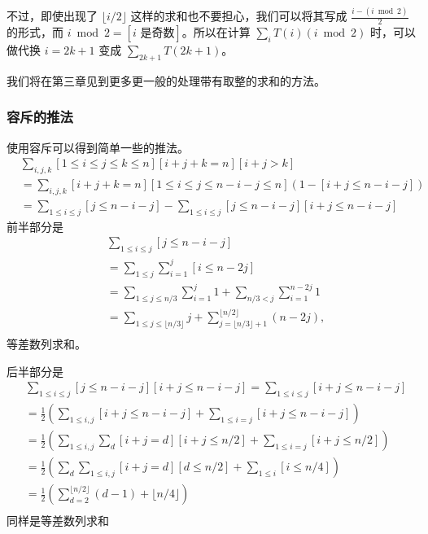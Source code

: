    不过，即使出现了 $\lfloor i/2\rfloor$ 这样的求和也不要担心，我们可以将其写成 $\frac{i-(i\bmod 2)}{2}$ 的形式，而 $i\bmod 2=[i\text{ 是奇数}]$。所以在计算 $\sum_{i} T(i)(i\bmod 2)$ 时，可以做代换 $i=2k+1$ 变成 $\sum_{2k+1}T(2k+1)$。

    我们将在第三章见到更多更一般的处理带有取整的求和的方法。
\subsubsection*{容斥的推法}
    使用容斥可以得到简单一些的推法。
    $$
    \begin{aligned}
        &\sum_{i,j,k}[1\le i\le j\le k\le n][i+j+k=n][i+j>k]\\
        &=\sum_{i,j,k}[i+j+k=n][1\le i\le j\le n-i-j\le n](1-[i+j\le n-i-j])\\
        &=\sum_{1\le i\le j}[j\le n-i-j]-\sum_{1\le i\le j}[j\le n-i-j][i+j\le n-i-j]
    \end{aligned}
    $$
    前半部分是
    $$
    \begin{aligned}
        &\sum_{1\le i\le j}[j\le n-i-j]\\
        &=\sum_{1\le j}\sum_{i=1}^j[i\le n-2j]\\
        &=\sum_{1\le j\le n/3}\sum_{i=1}^j 1+\sum_{n/3<j}\sum_{i=1}^{n-2j}1\\
        &=\sum_{1\le j\le \lfloor n/3\rfloor}j+\sum_{j=\lfloor n/3\rfloor+1}^{\lfloor n/2\rfloor}(n-2j),\\
    \end{aligned}
    $$    
    等差数列求和。

    后半部分是
    $$
    \begin{aligned}
        &\sum_{1\le i\le j}[j\le n-i-j][i+j\le n-i-j]=\sum_{1\le i\le j}[i+j\le n-i-j]\\
        &=\frac{1}{2}\left(\sum_{1\le i,j}[i+j\le n-i-j]+\sum_{1\le i=j}[i+j\le n-i-j]\right)\\
        &=\frac{1}{2}\left(\sum_{1\le i,j}\sum_d[i+j=d][i+j\le n/2]+\sum_{1\le i=j}[i+j\le n/2]\right)\\
        &=\frac{1}{2}\left(\sum_d\sum_{1\le i,j}[i+j=d][d\le n/2]+\sum_{1\le i}[i\le n/4]\right)\\
        &=\frac{1}{2}\left(\sum_{d=2}^{\lfloor n/2\rfloor}(d-1)+\lfloor n/4\rfloor\right)\\
    \end{aligned}
    $$
    同样是等差数列求和
    
